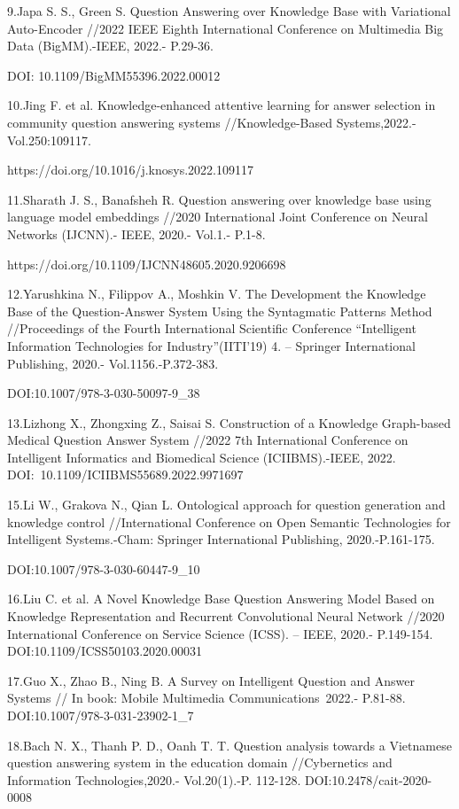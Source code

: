 \begin{noparindent}
9.Japa S. S., Green S. Question Answering over Knowledge Base with
Variational Auto-Encoder //2022 IEEE Eighth International Conference on
Multimedia Big Data (BigMM).-IEEE, 2022.- P.29-36.

DOI: 10.1109/BigMM55396.2022.00012

10.Jing F. et al. Knowledge-enhanced attentive learning for answer
selection in community question answering systems //Knowledge-Based
Systems,2022.- Vol.250:109117.

https://doi.org/10.1016/j.knosys.2022.109117

11.Sharath J. S., Banafsheh R. Question answering over knowledge base
using language model embeddings //2020 International Joint Conference on
Neural Networks (IJCNN).- IEEE, 2020.- Vol.1.- P.1-8.

https://doi.org/10.1109/IJCNN48605.2020.9206698

12.Yarushkina N., Filippov A., Moshkin V. The Development the Knowledge
Base of the Question-Answer System Using the Syntagmatic Patterns Method
//Proceedings of the Fourth International Scientific Conference
``Intelligent Information Technologies for Industry''(IITI'19) 4. --
Springer International Publishing, 2020.- Vol.1156.-P.372-383.

DOI:10.1007/978-3-030-50097-9\_38

13.Lizhong X., Zhongxing Z., Saisai S. Construction of a Knowledge
Graph-based Medical Question Answer System //2022 7th International
Conference on Intelligent Informatics and Biomedical Science
(ICIIBMS).-IEEE, 2022. DOI:~10.1109/ICIIBMS55689.2022.9971697

15.Li W., Grakova N., Qian L. Ontological approach for question
generation and knowledge control //International Conference on Open
Semantic Technologies for Intelligent Systems.-Cham: Springer
International Publishing, 2020.-P.161-175.

DOI:10.1007/978-3-030-60447-9\_10

16.Liu C. et al. A Novel Knowledge Base Question Answering Model Based
on Knowledge Representation and Recurrent Convolutional Neural Network
//2020 International Conference on Service Science (ICSS). -- IEEE,
2020.- P.149-154. DOI:10.1109/ICSS50103.2020.00031

17.Guo X., Zhao B., Ning B. A Survey on Intelligent Question and Answer
Systems // In book: Mobile Multimedia Communications~2022.- P.81-88.
DOI:10.1007/978-3-031-23902-1\_7

18.Bach N. X., Thanh P. D., Oanh T. T. Question analysis towards a
Vietnamese question answering system in the education domain
//Cybernetics and Information Technologies,2020.- Vol.20(1).-P. 112-128.
DOI:10.2478/cait-2020-0008


\end{noparindent}
